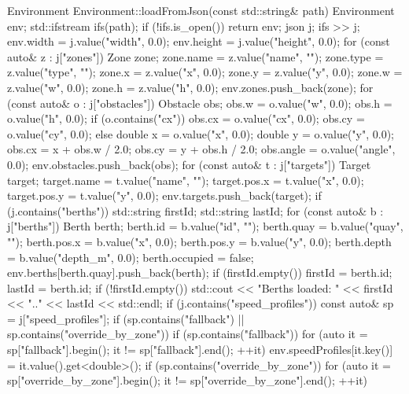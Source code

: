 \documentclass[10pt,letterpaper]{jsarticle}
\begin{document}
\begin{cppcode}
Environment Environment::loadFromJson(const std::string& path) {
    Environment env;
    std::ifstream ifs(path);
    if (!ifs.is_open()) return env;
    json j;
    ifs >> j;
    env.width = j.value("width", 0.0);
    env.height = j.value("height", 0.0);
    for (const auto& z : j["zones"]) {
        Zone zone;
        zone.name = z.value("name", "");
        zone.type = z.value("type", "");
        zone.x = z.value("x", 0.0);
        zone.y = z.value("y", 0.0);
        zone.w = z.value("w", 0.0);
        zone.h = z.value("h", 0.0);
        env.zones.push_back(zone);
    }
    for (const auto& o : j["obstacles"]) {
        Obstacle obs{};
        obs.w = o.value("w", 0.0);
        obs.h = o.value("h", 0.0);
        if (o.contains("cx")) {
            obs.cx = o.value("cx", 0.0);
            obs.cy = o.value("cy", 0.0);
        } else {
            double x = o.value("x", 0.0);
            double y = o.value("y", 0.0);
            obs.cx = x + obs.w / 2.0;
            obs.cy = y + obs.h / 2.0;
        }
        obs.angle = o.value("angle", 0.0);
        env.obstacles.push_back(obs);
    }
    for (const auto& t : j["targets"]) {
        Target target;
        target.name = t.value("name", "");
        target.pos.x = t.value("x", 0.0);
        target.pos.y = t.value("y", 0.0);
        env.targets.push_back(target);
    }
    if (j.contains("berths")) {
        std::string firstId;
        std::string lastId;
        for (const auto& b : j["berths"]) {
            Berth berth;
            berth.id = b.value("id", "");
            berth.quay = b.value("quay", "");
            berth.pos.x = b.value("x", 0.0);
            berth.pos.y = b.value("y", 0.0);
            berth.depth = b.value("depth_m", 0.0);
            berth.occupied = false;
            env.berths[berth.quay].push_back(berth);
            if (firstId.empty()) firstId = berth.id;
            lastId = berth.id;
        }
        if (!firstId.empty()) {
            std::cout << "Berths loaded: " << firstId << ".." << lastId << std::endl;
        }
    }
    if (j.contains("speed_profiles")) {
        const auto& sp = j["speed_profiles"];
        if (sp.contains("fallback") || sp.contains("override_by_zone")) {
            if (sp.contains("fallback")) {
                for (auto it = sp["fallback"].begin(); it != sp["fallback"].end(); ++it) {
                    env.speedProfiles[it.key()] = it.value().get<double>();
                }
            }
            if (sp.contains("override_by_zone")) {
                for (auto it = sp["override_by_zone"].begin(); it != sp["override_by_zone"].end(); ++it) {
}}}}}
\end{cppcode}
\end{document}
